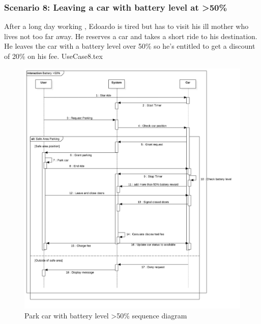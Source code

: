\documentclass[12pt]{article}
\begin{document}
		\subsubsection{Scenario 8: Leaving a car with battery level at \textgreater 50\%}
		After a long day working , Edoardo is tired but has to visit his ill mother who lives not too
		far away. He reserves a car and takes a short ride to his destination. He leaves the car with
		a battery level over 50\% so he's entitled to get a discount of 20\% on his fee.
		\FloatBarrier
		{UseCase8.tex}
		\newpage
		\begin{figure}[htbp]
		\caption{Park car with battery level \textgreater 50\% sequence diagram}
		\includegraphics[scale=0.49]{Images/SequenceDiagram/Battery.png}
 	 	\end{figure}
 	 	\clearpage
		
\end{document}
